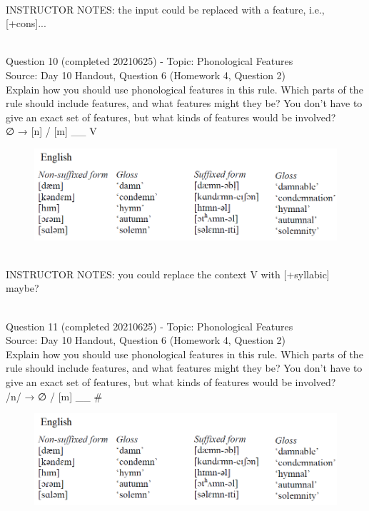 \documentclass[12pt]{article}
\begin{document}
~\\
INSTRUCTOR NOTES: the input could be replaced with a feature, i.e., [+cons]...


~\\

{\large Question 10} (completed 20210625) - Topic: Phonological Features\\
Source: Day 10 Handout, Question 6 (Homework 4, Question 2)\\

Explain how you should use phonological features in this rule. Which parts of the rule should include features, and what features might they be? You don't have to give an exact set of features, but what kinds of features would be involved?\\

∅ → {[n]} / {[m]} \_\_ V

\begin{figure}[H]
\includegraphics{../images/english_stemalternations.png}
\end{figure}

~\\
INSTRUCTOR NOTES: you could replace the context V with [+syllabic] maybe?


~\\

{\large Question 11} (completed 20210625) - Topic: Phonological Features\\
Source: Day 10 Handout, Question 6 (Homework 4, Question 2)\\

Explain how you should use phonological features in this rule. Which parts of the rule should include features, and what features might they be? You don't have to give an exact set of features, but what kinds of features would be involved?\\

/n/ → ∅ / {[m]} \_\_ \#

\begin{figure}[H]
\includegraphics{../images/english_stemalternations.png}
\end{figure}
\end{document}
